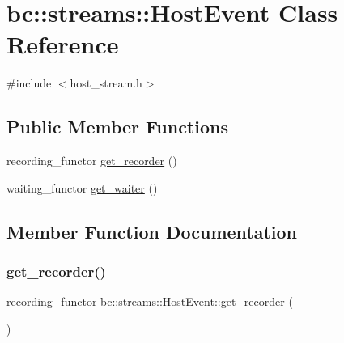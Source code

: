 \hypertarget{classbc_1_1streams_1_1HostEvent}{}\section{bc\+:\+:streams\+:\+:Host\+Event Class Reference}
\label{classbc_1_1streams_1_1HostEvent}


{\ttfamily \#include $<$host\+\_\+stream.\+h$>$}

\subsection*{Public Member Functions}
\begin{DoxyCompactItemize}
\item 
recording\+\_\+functor \hyperlink{classbc_1_1streams_1_1HostEvent_a134ca97cbcda8da5ecb55ebc74583ef4}{get\+\_\+recorder} ()
\item 
waiting\+\_\+functor \hyperlink{classbc_1_1streams_1_1HostEvent_acfc55b050f4c288236676d325ce1cba3}{get\+\_\+waiter} ()
\end{DoxyCompactItemize}


\subsection{Member Function Documentation}
\mbox{\label{classbc_1_1streams_1_1HostEvent_a134ca97cbcda8da5ecb55ebc74583ef4}} 
\subsubsection{\texorpdfstring{get\+\_\+recorder()}{get\_recorder()}}
{\footnotesize\ttfamily recording\+\_\+functor bc\+::streams\+::\+Host\+Event\+::get\+\_\+recorder (\begin{DoxyParamCaption}{ }\end{DoxyParamCaption})\hspace{0.3cm}{\ttfamily [inline]}}

\mbox{\label{classbc_1_1streams_1_1HostEvent_acfc55b050f4c288236676d325ce1cba3}} 

